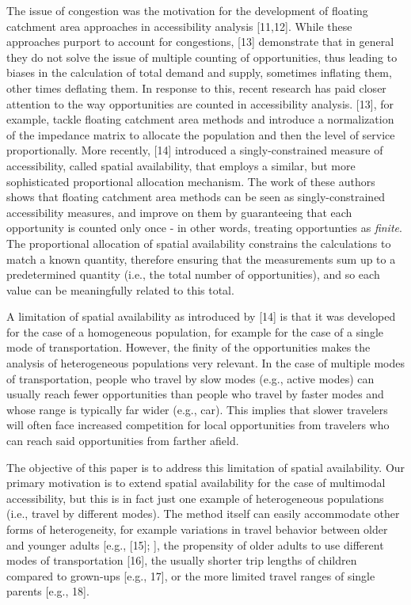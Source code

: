 \documentclass[10pt,letterpaper]{article}
\begin{document}
The issue of congestion was the motivation for the development of
floating catchment area approaches in accessibility analysis
{[}11,12{]}. While these approaches purport to account for congestions,
{[}13{]} demonstrate that in general they do not solve the issue of
multiple counting of opportunities, thus leading to biases in the
calculation of total demand and supply, sometimes inflating them, other
times deflating them. In response to this, recent research has paid
closer attention to the way opportunities are counted in accessibility
analysis. {[}13{]}, for example, tackle floating catchment area methods
and introduce a normalization of the impedance matrix to allocate the
population and then the level of service proportionally. More recently,
{[}14{]} introduced a singly-constrained measure of accessibility,
called spatial availability, that employs a similar, but more
sophisticated proportional allocation mechanism. The work of these
authors shows that floating catchment area methods can be seen as
singly-constrained accessibility measures, and improve on them by
guaranteeing that each opportunity is counted only once - in other
words, treating opportunties as \emph{finite}. The proportional
allocation of spatial availability constrains the calculations to match
a known quantity, therefore ensuring that the measurements sum up to a
predetermined quantity (i.e., the total number of opportunities), and so
each value can be meaningfully related to this total.

A limitation of spatial availability as introduced by {[}14{]} is that
it was developed for the case of a homogeneous population, for example
for the case of a single mode of transportation. However, the finity of
the opportunities makes the analysis of heterogeneous populations very
relevant. In the case of multiple modes of transportation, people who
travel by slow modes (e.g., active modes) can usually reach fewer
opportunities than people who travel by faster modes and whose range is
typically far wider (e.g., car). This implies that slower travelers will
often face increased competition for local opportunities from travelers
who can reach said opportunities from farther afield.

The objective of this paper is to address this limitation of spatial
availability. Our primary motivation is to extend spatial availability
for the case of multimodal accessibility, but this is in fact just one
example of heterogeneous populations (i.e., travel by different modes).
The method itself can easily accommodate other forms of heterogeneity,
for example variations in travel behavior between older and younger
adults {[}e.g., {[}15{]}; {]}, the propensity of older adults to use
different modes of transportation {[}16{]}, the usually shorter trip
lengths of children compared to grown-ups {[}e.g., 17{]}, or the more
limited travel ranges of single parents {[}e.g., 18{]}.
\end{document}
